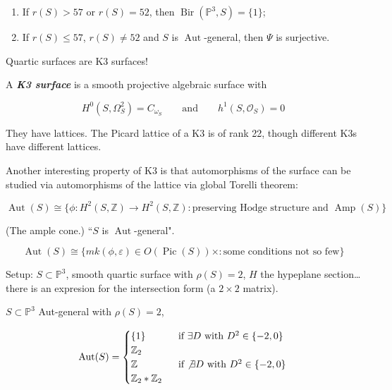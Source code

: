 \medskip{}
\begin{enumerate}
\item[(i)] If $r(S)> 57$ or $r(S)=52$, then
$\operatorname{Bir}(\mathbb{P}^3,S)=\{1\}$;
\item[(ii)] If $r(S) \leq 57$, $r(S) \neq 52$
and $S$ is $\operatorname{Aut}$-general, then
$\Psi$ is surjective.
\end{enumerate}

\medskip{}

Quartic surfaces are K3 surfaces!

\begin{definition}
\label{definition-paiva-1}
A \textit{\textbf{K3 surface}} is a smooth
projective algebraic surface with

$$
H^{0}(S,\Omega^{2}_S) = C_{\omega_S}\qquad
\text{and} \qquad h^1(S,\mathcal{O}_S)=0
$$

\end{definition}

They have lattices. The Picard lattice of a
K3 is of rank 22, though different K3s have
different lattices.

Another interesting property of K3 is that
automorphisms of the surface can be studied
via automorphisms of the lattice via global
Torelli theorem:

\begin{theorem}
\label{theorem-paiva-2}

$$
\operatorname{Aut}(S)\cong
\{\phi:H^{2}(S,\mathbb{Z})\to
H^{2}(S,\mathbb{Z}):\text{preserving Hodge
structure and }\operatorname{Amp}(S) \}
$$

(The ample cone.) ``$S$ is
$\operatorname{Aut}$-general".

$$
\operatorname{Aut}(S)
\cong\{mk(\phi,\varepsilon) \in
O(\operatorname{Pic}(S) ) \times :{\text{some
conditions not so few} }\}
$$

\end{theorem}

\begin{example}[Case $\rho(S)=2$]
\label{example-paiva-1}
Setup: $S \subset \mathbb{P}^3$, smooth
quartic surface with $\rho(S)=2$, $H$ the
hypeplane section\ldots{} there is an
expresion for the intersection form (a $2
\times 2$ matrix).
\end{example}

\begin{proposition}
\label{proposition-paiva-1}
$S \subset \mathbb{P}^3$ Aut-general with
$\rho(S)=2$,

$$
\operatorname{Aut}(S)=\begin{cases}
\{1\}\qquad & \text{ if $\exists D$ with $D^2
\in \{-2,0\}$} \\
\mathbb{Z}_2\qquad &\\
\mathbb{Z} & \text{ if $\not \exists D$ with
$D^2 \in \{-2,0\}$} \\
\mathbb{Z}_2 * \mathbb{Z}_2
\end{cases}
$$

\end{proposition}

